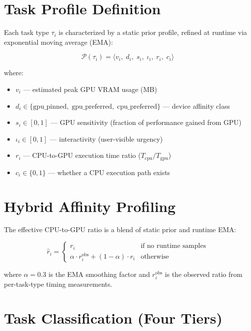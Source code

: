 \documentclass{article}
\begin{document}
\section*{Task Profile Definition}

Each task type $\tau_i$ is characterized by a static prior profile, refined at
runtime via exponential moving average (EMA):

\begin{equation}
\mathcal{P}(\tau_i) = \bigl\langle
    v_i,\; d_i,\; s_i,\; \iota_i,\; r_i,\; c_i
\bigr\rangle
\end{equation}

where:
\begin{itemize}
    \item $v_i$ --- estimated peak GPU VRAM usage (MB)
    \item $d_i \in \{\text{gpu\_pinned},\; \text{gpu\_preferred},\; \text{cpu\_preferred}\}$ --- device affinity class
    \item $s_i \in [0, 1]$ --- GPU sensitivity (fraction of performance gained from GPU)
    \item $\iota_i \in [0, 1]$ --- interactivity (user-visible urgency)
    \item $r_i$ --- CPU-to-GPU execution time ratio ($T_{\text{cpu}} / T_{\text{gpu}}$)
    \item $c_i \in \{0, 1\}$ --- whether a CPU execution path exists
\end{itemize}

\section*{Hybrid Affinity Profiling}

The effective CPU-to-GPU ratio is a blend of static prior and runtime EMA:

\begin{equation}
\hat{r}_i = \begin{cases}
    r_i & \text{if no runtime samples} \\[4pt]
    \alpha \cdot r_i^{\text{obs}} + (1 - \alpha) \cdot r_i & \text{otherwise}
\end{cases}
\end{equation}

where $\alpha = 0.3$ is the EMA smoothing factor and $r_i^{\text{obs}}$ is the
observed ratio from per-task-type timing measurements.

\section*{Task Classification (Four Tiers)}
\end{document}

